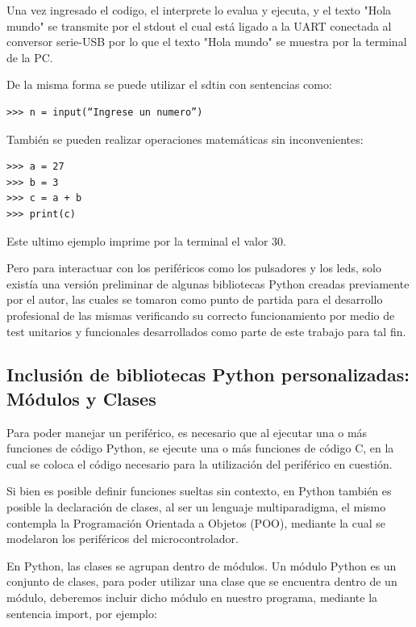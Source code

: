 Una vez ingresado el codigo, el interprete lo evalua y ejecuta, y el texto "Hola mundo" se transmite por el stdout el cual está ligado a la UART conectada al conversor serie-USB por lo que el texto "Hola mundo" se muestra por la terminal de la PC.

De la misma forma se puede utilizar el sdtin con sentencias como:

\begin{verbatim}
>>> n = input(“Ingrese un numero”)
\end{verbatim}

También se pueden realizar operaciones matemáticas sin inconvenientes:

\begin{verbatim}
>>> a = 27
>>> b = 3
>>> c = a + b
>>> print(c)
\end{verbatim}

Este ultimo ejemplo imprime por la terminal el valor 30.

Pero para interactuar con los periféricos como los pulsadores y los leds, solo existía una versión preliminar de algunas bibliotecas Python creadas previamente por el autor, las cuales se tomaron como punto de partida para el desarrollo profesional de las mismas verificando su correcto funcionamiento por medio de test unitarios y funcionales desarrollados como parte de este trabajo para tal fin.


\subsection{Inclusión de bibliotecas Python personalizadas: Módulos y Clases} 

Para poder manejar un periférico, es necesario que al ejecutar una o más funciones de código Python, se ejecute una o más funciones de código C, en la cual se coloca el código necesario para la utilización del periférico en cuestión.

Si bien es posible definir funciones sueltas sin contexto, en Python también es posible la declaración de clases, al ser un lenguaje multiparadigma, el mismo contempla la Programación Orientada a Objetos (POO), mediante la cual se modelaron los periféricos del microcontrolador.

En Python, las clases se agrupan dentro de módulos. Un módulo Python es un conjunto de clases, para poder utilizar una clase que se encuentra dentro de un módulo, deberemos incluir dicho módulo en nuestro programa, mediante la sentencia import, por ejemplo:

